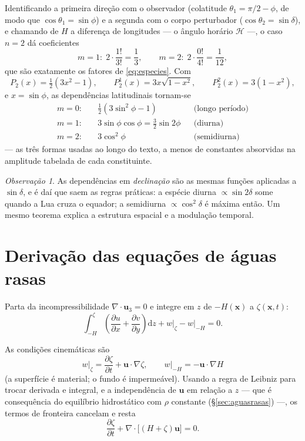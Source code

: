\documentclass[11pt,a4paper,oneside]{report}
\theoremstyle{definition}
\theoremstyle{plain}
\theoremstyle{remark}
\newtheorem{observacao}[definicao]{Observação}
\newcommand{\vect}[1]{\bm{#1}}
\newcommand{\pd}[2]{\frac{\partial #1}{\partial #2}}
\newcommand{\dd}{\mathrm{d}}
\begin{document}
Identificando a primeira direção com o observador (colatitude
$\theta_1=\pi/2-\phi$, de modo que $\cos\theta_1=\sin\phi$) e a segunda com o
corpo perturbador ($\cos\theta_2=\sin\delta$), e chamando de $H$ a diferença de
longitudes — o ângulo horário $\mathcal{H}$ —, o caso $n=2$ dá coeficientes
\begin{equation}
m=1:\;2\cdot\frac{1!}{3!}=\frac13,
\qquad
m=2:\;2\cdot\frac{0!}{4!}=\frac1{12},
\end{equation}
que são exatamente os fatores de \eqref{eq:especies}. Com
\begin{equation}
P_2(x)=\tfrac12(3x^{2}-1),\qquad
P_2^{1}(x)=3x\sqrt{1-x^{2}},\qquad
P_2^{2}(x)=3(1-x^{2}),
\end{equation}
e $x=\sin\phi$, as dependências latitudinais tornam-se
\begin{align}
m=0:&\quad \tfrac12(3\sin^{2}\phi-1) &&\text{(longo período)}\\
m=1:&\quad 3\sin\phi\cos\phi=\tfrac32\sin 2\phi &&\text{(diurna)}\\
m=2:&\quad 3\cos^{2}\phi &&\text{(semidiurna)}
\end{align}
— as três formas usadas ao longo do texto, a menos de constantes absorvidas
na amplitude tabelada de cada constituinte.

\begin{observacao}
As dependências em \emph{declinação} são as mesmas funções aplicadas a
$\sin\delta$, e é daí que saem as regras práticas: a espécie diurna
$\propto\sin 2\delta$ some quando a Lua cruza o equador; a semidiurna
$\propto\cos^{2}\delta$ é máxima então. Um mesmo teorema explica a estrutura
espacial e a modulação temporal.
\end{observacao}

\chapter{Derivação das equações de águas rasas}
\label{ap:sw}

Parta da incompressibilidade $\nabla\cdot\vect{u}_3=0$ e integre em $z$ de
$-H(\vect{x})$ a $\zeta(\vect{x},t)$:
\begin{equation}
\int_{-H}^{\zeta}\left(\pd{u}{x}+\pd{v}{y}\right)\dd z
+ w\big|_{\zeta}-w\big|_{-H}=0 .
\end{equation}

As condições cinemáticas são
\begin{equation}
w\big|_{\zeta}=\pd{\zeta}{t}+\vect{u}\cdot\nabla\zeta,
\qquad
w\big|_{-H}=-\vect{u}\cdot\nabla H
\end{equation}
(a superfície é material; o fundo é impermeável). Usando a regra de Leibniz
para trocar derivada e integral, e a independência de $\vect{u}$ em relação a
$z$ — que é consequência do equilíbrio hidrostático com $\rho$ constante
(\S\ref{sec:aguasrasas}) —, os termos de fronteira cancelam e resta
\begin{equation}
\pd{\zeta}{t}+\nabla\cdot\big[(H+\zeta)\vect{u}\big]=0 .
\end{equation}
\end{document}
